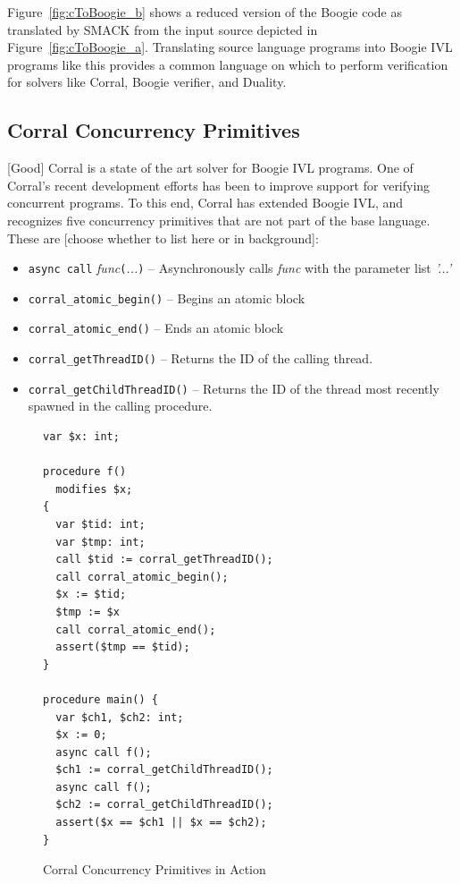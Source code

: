 Figure~\ref{fig:cToBoogie_b} shows a reduced version of the Boogie
code as translated by SMACK from the input source depicted in
Figure~\ref{fig:cToBoogie_a}.  Translating source language programs
into Boogie IVL programs like this provides a common language on which
to perform verification for solvers like Corral, Boogie verifier, and
Duality.  

\subsection{Corral Concurrency Primitives}
[Good]
Corral is a state of the art solver for Boogie IVL programs.  One of
Corral's recent development efforts has been to improve support for
verifying concurrent programs.  To this end, Corral has extended
Boogie IVL, and recognizes five concurrency primitives that are not
part of the base language.  These are [choose whether to list here or
in background]: 

\begin{itemize}
\item \lstinline|async call|
  \emph{func}\lstinline|(|\emph{...}\lstinline|)| -- Asynchronously
  calls \emph{func} with the parameter list \emph{'...'} 
\item \lstinline|corral_atomic_begin()| -- Begins an atomic block
\item \lstinline|corral_atomic_end()| -- Ends an atomic block
\item \lstinline|corral_getThreadID()| -- Returns the ID of the
  calling thread.
\item \lstinline|corral_getChildThreadID()| -- Returns the ID of the
  thread most recently spawned in the calling procedure. 
\end{itemize}

\begin{figure}[h]
\centering
\caption{Corral Concurrency Primitives in Action}
\label{fig:corralprimitives}
\begin{lstlisting}[language=boogie]
var $x: int;

procedure f() 
  modifies $x;
{
  var $tid: int;
  var $tmp: int;
  call $tid := corral_getThreadID();
  call corral_atomic_begin();
  $x := $tid;
  $tmp := $x
  call corral_atomic_end();
  assert($tmp == $tid);
}

procedure main() {
  var $ch1, $ch2: int;
  $x := 0;
  async call f();
  $ch1 := corral_getChildThreadID();
  async call f();
  $ch2 := corral_getChildThreadID();
  assert($x == $ch1 || $x == $ch2);
}
\end{lstlisting}
\end{figure}

